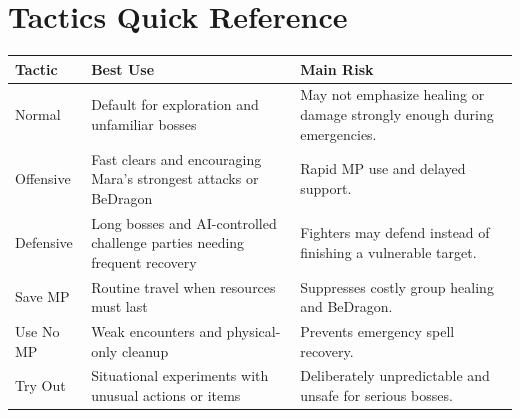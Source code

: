 \documentclass[
  american,
  10pt,
  letterpaper,
  oneside,
  open=any]{scrreprt}
\newcounter{none} %
\newenvironment{guidetable}{%
  \small\setstretch{1.0}%
  \setlength{\tabcolsep}{4pt}%
  \setlength{\LTpre}{8pt}\setlength{\LTpost}{10pt}%
  \renewcommand{\arraystretch}{1.16}%
}{ }
\begin{document}
\section{Tactics Quick Reference}\label{tactics-quick-reference}

\begin{guidetable}

{\def\LTcaptype{none} %
\begin{longtable}[]{@{}
  >{\raggedright\arraybackslash}p{}
  >{\raggedright\arraybackslash}p{}
  >{\raggedright\arraybackslash}p{}@{}}
\toprule\noalign{}
\begin{minipage}[b]{\linewidth}\raggedright
\color{GuideGreen}\bfseries Tactic
\end{minipage} & \begin{minipage}[b]{\linewidth}\raggedright
\color{GuideGreen}\bfseries Best Use
\end{minipage} & \begin{minipage}[b]{\linewidth}\raggedright
\color{GuideGreen}\bfseries Main Risk
\end{minipage} \\
\midrule\noalign{}
\endhead
\bottomrule\noalign{}
\endlastfoot
Normal & Default for exploration and unfamiliar bosses & May not
emphasize healing or damage strongly enough during emergencies. \\
Offensive & Fast clears and encouraging Mara's strongest attacks or
BeDragon & Rapid MP use and delayed support. \\
Defensive & Long bosses and AI-controlled challenge parties needing
frequent recovery & Fighters may defend instead of finishing a
vulnerable target. \\
Save MP & Routine travel when resources must last & Suppresses costly
group healing and BeDragon. \\
Use No MP & Weak encounters and physical-only cleanup & Prevents
emergency spell recovery. \\
Try Out & Situational experiments with unusual actions or items &
Deliberately unpredictable and unsafe for serious bosses. \\
\end{longtable}
}

\end{guidetable}
\end{document}
